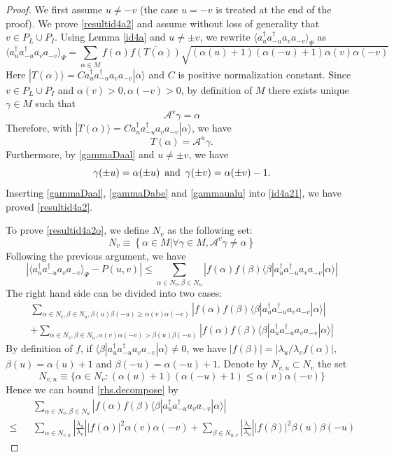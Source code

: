 \documentclass[11pt]{article}
\numberwithin{equation}{section}
\newcommand{\beq}{\begin{equation}}
\newcommand{\eeq}{\end{equation}}
\newcommand{\beqa}{\begin{eqnarray}}
\newcommand{\eeqa}{\end{eqnarray}}
\newcommand\rmand{ \,\,\,{\rm and}\,\,\, }
\newcommand\al{{\alpha}}
\newcommand\be{\beta}
\theoremstyle{definition}
\begin{document}
\begin{proof}
We first assume $u\neq -v$ (the case $u=-v$ is treated at the end of the proof). We  prove \eqref{resultid4a2} and assume without loss of generality  that $v\in P_L\cup P_I$. Using Lemma \ref{id4a} and $u\neq\pm v$, we rewrite $\langle a_u^\dagger a_{-u}^\dagger a_v  a_{-v}\rangle_\Psi$ as
\beq\label{id4a21}
\langle a_u^\dagger a_{-u}^\dagger a_v  a_{-v}\rangle_\Psi=\sum_{\al\in M}f(\al)\overline{f(T(\al))}\sqrt{(\al(u)+1)(\al(-u)+1)\al(v)\al(-v)}
\eeq
Here $|T(\al)\rangle=Ca_u^\dagger a_{-u}^\dagger a_v  a_{-v}|\al\rangle$ and $C$ is positive normalization constant. Since $v\in P_L\cup P_I$ and $\al(v)>0, \al(-v)>0$, by definition of $M$  
there exists unique $\gamma\in M$ such that 
\beq\label{gammaDaal}
 \mathcal A^v\gamma=\al
\eeq
Therefore, with $|T(\al)\rangle=Ca_u^\dagger a_{-u}^\dagger a_v  a_{-v}|\al\rangle$, we have
\beq\label{gammaDabe}T(\al)= \mathcal A^u\gamma.
\eeq
Furthermore, by \eqref{gammaDaal} and $u\neq\pm v$, we have
\beq\label{gammaualu}
\gamma(\pm u)=\al(\pm u) \rmand \gamma(\pm v)=\al(\pm v)-1.
\eeq
Inserting \eqref{gammaDaal}, \eqref{gammaDabe} and \eqref{gammaualu} into \eqref{id4a21}, we 
have proved  \eqref{resultid4a2}.

To  prove \eqref{resultid4a2o}, 
we define $N_v$ as the following set:
\beq
N_v\equiv\left\{\al\in M|\forall \gamma\in M,  \mathcal A^v\gamma\neq \al\right\}
\eeq
Following the previous argument, we have 
\beq
\left|\langle a_u^\dagger a_{-u}^\dagger a_v  a_{-v}\rangle_\Psi-P(u,v)\right|\leq\sum_{\al\in N_v,\be\in N_u} \left|f(\al)f(\be)\langle \be|a_u^\dagger a_{-u}^\dagger a_v  a_{-v}|\al\rangle\right|
\eeq
The right hand side can be divided into two cases: 
\beqa\label{rhs.decompose}
\sum_{\al\in N_v,\be\in N_u, \be(u)\be(-u)\geq \al(v)\al(-v)}\left|f(\al)f(\be)\langle \be|a_u^\dagger a_{-u}^\dagger a_v  a_{-v}|\al\rangle\right|\\\nonumber
+\sum_{\al\in N_v,\be\in N_u, \al(v)\al(-v)>\be(u)\be(-u) }\left|f(\al)f(\be)\langle \be|a_u^\dagger a_{-u}^\dagger a_v  a_{-v}|\al\rangle\right|
\eeqa
By definition of $f$, if $\langle \be|a_u^\dagger a_{-u}^\dagger a_v  a_{-v}|\al\rangle\neq 0$,  we have $|f(\be)|=|\lambda_u/\lambda_vf(\al)|$,  $\be(u)=\al(u)+1$ and $\be(-u)=\al(-u)+1$. Denote by  $N_{v,u}\subset N_v$ the set 
\beq
N_{v,u}\equiv\{\al\in N_v:(\al(u)+1)(\al(-u)+1)\leq \al(v)\al(-v)\}
\eeq
Hence   we can bound  \eqref{rhs.decompose} by
\beqa\label{temp8.41}
&&\sum_{\al\in N_v,\be\in N_u}\left|f(\al)f(\be)\langle \be|a_u^\dagger a_{-u}^\dagger a_v  a_{-v}|\al\rangle\right|\\\nonumber
\leq&&\sum_{\al \in N_{v,u}}\left | \frac{\lambda_u}{\lambda_v} \right | |f(\al)|^2\al(v)\al(-v)+\sum_{\be \in N_{u,v}}\left | \frac{\lambda_v}{\lambda_u} \right | |f(\be)|^2\be(u)\be(-u)
\eeqa




\end{proof}
\end{document}
